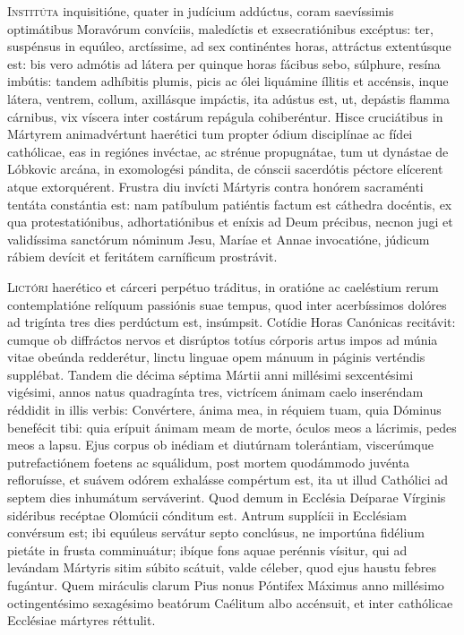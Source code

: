 

\lettrine{I}{nstitúta} inquisitióne, quater in judícium addúctus,
coram saevíssimis optimátibus Moravórum convíciis,
maledíctis et exsecratiónibus excéptus:
ter, suspénsus in equúleo, arctíssime, ad sex continéntes horas,
attráctus extentúsque est:
bis vero admótis ad látera per quinque horas fácibus sebo,
súlphure, resína imbútis:
tandem adhíbitis plumis, picis ac ólei liquámine íllitis et accénsis,
inque látera, ventrem, collum, axillásque impáctis,
ita adústus est, ut, depástis flamma cárnibus,
vix víscera inter costárum repágula cohiberéntur.
Hisce cruciátibus in Mártyrem animadvértunt haerétici
tum propter ódium disciplínae ac fídei cathólicae,
eas in regiónes invéctae, ac strénue propugnátae,
tum ut dynástae de Lóbkovic arcána,
in exomologési pándita, de cónscii sacerdótis péctore elícerent
atque extorquérent.
Frustra diu invícti Mártyris contra honórem sacraménti tentáta
constántia est:
nam patíbulum patiéntis factum est cáthedra docéntis,
ex qua protestatiónibus, adhortatiónibus et eníxis ad Deum précibus,
necnon jugi et validíssima sanctórum nóminum Jesu, Maríae et Annae
invocatióne, júdicum rábiem devícit et feritátem carníficum prostrávit.


\lettrine{L}{ictóri} haerético et cárceri perpétuo tráditus,
in oratióne ac caeléstium rerum contemplatióne relíquum passiónis
suae tempus,
quod inter acerbíssimos dolóres ad trigínta tres dies perdúctum est,
insúmpsit.
Cotídie Horas Canónicas recitávit:
cumque ob diffráctos nervos et disrúptos totíus córporis artus
impos ad múnia vitae obeúnda redderétur,
linctu linguae opem mánuum in páginis verténdis supplébat.
Tandem die décima séptima Mártii
anni millésimi sexcentésimi vigésimi, annos natus quadragínta tres,
victrícem ánimam caelo inseréndam réddidit in illis verbis:
Convértere, ánima mea, in réquiem tuam,
quia Dóminus benefécit tibi:
quia erípuit ánimam meam de morte, óculos meos a lácrimis,
pedes meos a lapsu.
Ejus corpus ob inédiam et diutúrnam tolerántiam,
viscerúmque putrefactiónem foetens ac squálidum,
post mortem quodámmodo juvénta refloruísse,
et suávem odórem exhalásse compértum est,
ita ut illud Cathólici ad septem dies inhumátum serváverint.
Quod demum in Ecclésia Deíparae Vírginis sidéribus recéptae
Olomúcii cónditum est.
Antrum supplícii in Ecclésiam convérsum est;
ibi equúleus servátur septo conclúsus,
ne importúna fidélium pietáte in frusta comminuátur;
ibíque fons aquae perénnis vísitur,
qui ad levándam Mártyris sitim súbito scátuit,
valde céleber, quod ejus haustu febres fugántur.
Quem miráculis clarum Pius nonus Póntifex Máximus
anno millésimo octingentésimo sexagésimo
beatórum Caélitum albo accénsuit,
et inter cathólicae Ecclésiae mártyres réttulit.

